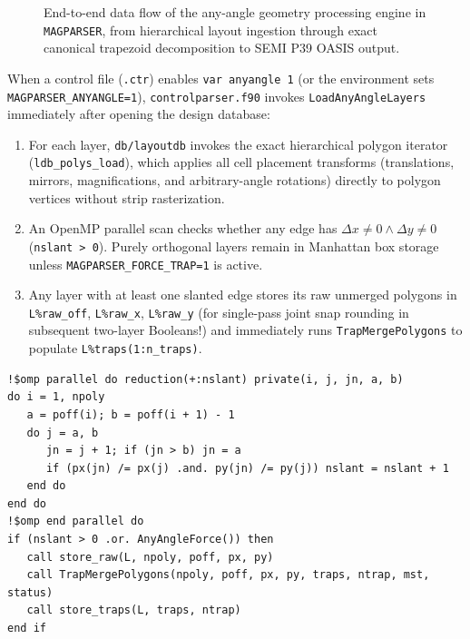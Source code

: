 \begin{figure}[htbp]
\caption{End-to-end data flow of the any-angle geometry processing engine in \texttt{MAGPARSER}, from hierarchical layout ingestion through exact canonical trapezoid decomposition to SEMI P39 OASIS output.}
\label{fig:pipeline}
\end{figure}

When a control file (\texttt{.ctr}) enables \texttt{var anyangle 1} (or the environment sets \texttt{MAGPARSER\_ANYANGLE=1}), \texttt{controlparser.f90} invokes \texttt{LoadAnyAngleLayers} immediately after opening the design database:
\begin{enumerate}
  \item For each layer, \texttt{db/layoutdb} invokes the exact hierarchical polygon iterator (\texttt{ldb\_polys\_load}), which applies all cell placement transforms (translations, mirrors, magnifications, and arbitrary-angle rotations) directly to polygon vertices without strip rasterization.
  \item An OpenMP parallel scan checks whether any edge has $\Delta x \ne 0 \land \Delta y \ne 0$ (\texttt{nslant > 0}). Purely orthogonal layers remain in Manhattan box storage unless \texttt{MAGPARSER\_FORCE\_TRAP=1} is active.
  \item Any layer with at least one slanted edge stores its raw unmerged polygons in \texttt{L\%raw\_off}, \texttt{L\%raw\_x}, \texttt{L\%raw\_y} (for single-pass joint snap rounding in subsequent two-layer Booleans!) and immediately runs \texttt{TrapMergePolygons} to populate \texttt{L\%traps(1:n\_traps)}.
\end{enumerate}

\begin{lstlisting}[caption={Exact slanted-layer detection and canonical merge in \texttt{src/anyangle\_ops.f90}.},label={lst:load_anyangle}]
!$omp parallel do reduction(+:nslant) private(i, j, jn, a, b)
do i = 1, npoly
   a = poff(i); b = poff(i + 1) - 1
   do j = a, b
      jn = j + 1; if (jn > b) jn = a
      if (px(jn) /= px(j) .and. py(jn) /= py(j)) nslant = nslant + 1
   end do
end do
!$omp end parallel do
if (nslant > 0 .or. AnyAngleForce()) then
   call store_raw(L, npoly, poff, px, py)
   call TrapMergePolygons(npoly, poff, px, py, traps, ntrap, mst, status)
   call store_traps(L, traps, ntrap)
end if
\end{lstlisting}

